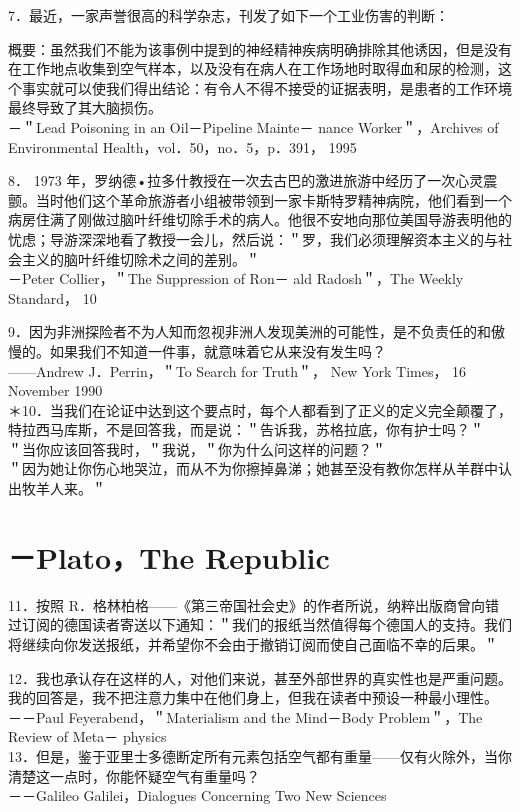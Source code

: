7．最近，一家声誉很高的科学杂志，刊发了如下一个工业伤害的判断：

概要：虽然我们不能为该事例中提到的神经精神疾病明确排除其他诱因，但是没有在工作地点收集到空气样本，以及没有在病人在工作场地时取得血和尿的检测，这个事实就可以使我们得出结论：有令人不得不接受的证据表明，是患者的工作环境最终导致了其大脑损伤。\\
－＂Lead Poisoning in an Oil－Pipeline Mainte－ nance Worker＂，Archives of Environmental Health，vol．50，no．5，p．391， 1995

8． 1973 年，罗纳德•拉多什教授在一次去古巴的激进旅游中经历了一次心灵震颤。当时他们这个革命旅游者小组被带领到一家卡斯特罗精神病院，他们看到一个病房住满了刚做过脑叶纤维切除手术的病人。他很不安地向那位美国导游表明他的忧虑；导游深深地看了教授一会儿，然后说：＂罗，我们必须理解资本主义的与社会主义的脑叶纤维切除术之间的差别。＂\\
－Peter Collier，＂The Suppression of Ron－ ald Radosh＂，The Weekly Standard， 10

9．因为非洲探险者不为人知而忽视非洲人发现美洲的可能性，是不负责任的和傲慢的。如果我们不知道一件事，就意味着它从来没有发生吗？\\
——Andrew J．Perrin，＂To Search for Truth＂， New York Times， 16 November 1990\\
＊10．当我们在论证中达到这个要点时，每个人都看到了正义的定义完全颠覆了，特拉西马库斯，不是回答我，而是说：＂告诉我，苏格拉底，你有护士吗？＂\\
＂当你应该回答我时，＂我说，＂你为什么问这样的问题？＂\\
＂因为她让你伤心地哭泣，而从不为你擦掉鼻涕；她甚至没有教你怎样从羊群中认出牧羊人来。＂

\section*{－Plato，The Republic}
11．按照 R．格林柏格——《第三帝国社会史》的作者所说，纳粹出版商曾向错过订阅的德国读者寄送以下通知：＂我们的报纸当然值得每个德国人的支持。我们将继续向你发送报纸，并希望你不会由于撤销订阅而使自己面临不幸的后果。＂

12．我也承认存在这样的人，对他们来说，甚至外部世界的真实性也是严重问题。我的回答是，我不把注意力集中在他们身上，但我在读者中预设一种最小理性。\\
－－Paul Feyerabend，＂Materialism and the Mind－Body Problem＂，The Review of Meta－ physics\\
13．但是，鉴于亚里士多德断定所有元素包括空气都有重量——仅有火除外，当你清楚这一点时，你能怀疑空气有重量吗？\\
－－Galileo Galilei，Dialogues Concerning Two New Sciences

